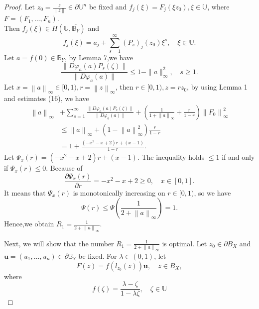 \documentclass{birkjour}
\theoremstyle{plain}
\theoremstyle{definition}
\theoremstyle{definition}
\begin{document}
\begin{proof}
	Let $z_0=\frac{z}{\left \| z \right \| } \in \partial \mathbb{U} ^n$ be fixed and $f_j(\xi )=F_j(\xi z_0), \xi \in \mathbb{U} $, where $F=(F_1,\dots ,F_n)$.\\
	Then $f_j(\xi )\in H(\mathbb{U},\overline{\mathbb{B}_Y} )$ and
	\begin{equation*}
		f_j(\xi )=a_j+\sum_{s=1}^{\infty} (P_s)_j(z_0)\xi ^s, \quad \xi \in \mathbb{U}.
	\end{equation*}
	Let $a=f(0)\in \mathbb{B}_Y$, by Lemma 7,we have
	\begin{equation}
	\frac{\|D\varphi_a(a)P_s(\zeta)\|}{\|D\varphi_a(a)\|}\le 1-\|a\|_\infty ^2, \quad s\ge 1.
	\end{equation}
	Let $x=\left \| a \right \|_{\infty}\in [0,1), r=\left \| z \right \|_{\infty}$, then $ r \in [0,1), z=rz_0$, by using Lemma 1 and estimates (16), we have
	\begin{align*}
		\left \| a \right \|_{\infty}&+\sum_{s=1}^{\infty}	\frac{\|D\varphi_a(a)P_s(\zeta)\|}{\|D\varphi_a(a)\|}+(\frac{1}{1+\left \| a \right \|_{\infty}} +\frac{r}{1-r}  )\left \| F_0 \right \|^2_{\infty} \\
		&\le \left \| a \right \|_{\infty}+(1-\left \| a \right \|_{\infty}^2)\frac{r}{1-r}\\
		&=1+\frac{(-x^2-x+2)r+(x-1)}{1-r}.
	\end{align*}
	Let $\Psi_x (r)=(-x^2-x+2)r+(x-1)$. The inequality holds $\le 1$ if and only if $\Psi_x (r) \le 0$. Because of
	\begin{equation*}\label{eq-4.1}
		\frac{\partial \Psi_x (r)}{\partial r} = -x^2-x+2 \ge 0, \quad x\in [0,1].
	\end{equation*}
	It means that $\Psi_x (r)$ is monotonically increasing on $r \in [0,1)$, so we have
	\begin{equation*}
		\Psi(r) \le \Psi(\frac{1}{2+\left \| a \right \|_{\infty} } ) =1.
	\end{equation*}
	Hence,we obtain $R_1=\frac{1}{2+\left \| a \right \|_{\infty} }$.
	\par
	Next, we will show that the number $R_1=\frac{1}{2+\left \| a \right \|_{\infty} }$ is optimal.
	Let $z_0\in \partial B_X$ and $\mathbf{u}=(u_1,\dots,u_n)\in \partial \mathbb{B}_Y$ be fixed. For $\lambda\in(0,1)$, let
	\begin{equation*}
		F(z)=f(l_{z_0}(z))\mathbf{u},\quad z\in B_X,
	\end{equation*}
	where
	\begin{equation*}
		f(\zeta)=\frac{\lambda-\zeta}{1-\lambda\zeta},\quad \zeta\in \mathbb{U}

\end{equation*}
\end{proof}
\end{document}
